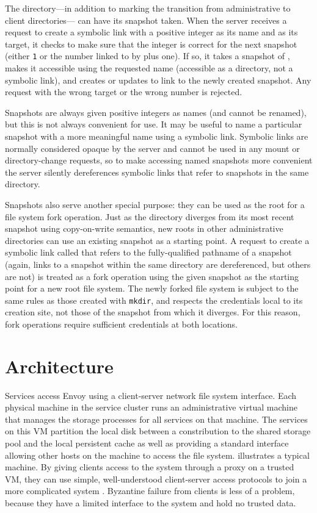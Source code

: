 The \current directory---in addition to marking the transition from administrative to client directories--- can have its snapshot taken. When the server receives a request to create a symbolic link with a positive integer as its name and \current as its target, it checks to make sure that the integer is correct for the next snapshot (either \texttt{1} or the number linked to by \snapshot plus one). If so, it takes a snapshot of \current, makes it accessible using the requested name (accessible as a directory, not a symbolic link), and creates or updates \snapshot to link to the newly created snapshot. Any request with the wrong target or the wrong number is rejected.

Snapshots are always given positive integers as names (and cannot be renamed), but this is not always convenient for use. It may be useful to name a particular snapshot with a more meaningful name using a symbolic link. Symbolic links are normally considered opaque by the server and cannot be used in any mount or directory-change requests, so to make accessing named snapshots more convenient the server silently dereferences symbolic links that refer to snapshots in the same directory.

Snapshots also serve another special purpose: they can be used as the root for a file system fork operation. Just as the \current directory diverges from its most recent snapshot using copy-on-write semantics, new \current roots in other administrative directories can use an existing snapshot as a starting point. A request to create a symbolic link called \current that refers to the fully-qualified pathname of a snapshot (again, links to a snapshot within the same directory are dereferenced, but others are not) is treated as a fork operation using the given snapshot as the starting point for a new root file system. The newly forked file system is subject to the same rules as those created with \texttt{mkdir}, and respects the credentials local to its creation site, not those of the snapshot from which it diverges. For this reason, fork operations require sufficient credentials at both locations.

\section{Architecture}

Services access Envoy using a client-server network file system interface. Each physical machine in the service cluster runs an administrative virtual machine that manages the storage processes for all services on that machine. The services on this VM partition the local disk between a constribution to the shared storage pool and the local persistent cache as well as providing a standard interface allowing other hosts on the machine to access the file system.  illustrates a typical machine. By giving clients access to the system through a proxy on a trusted VM, they can use simple, well-understood client-server access protocols to join a more complicated system \cite{shapiro}. Byzantine failure from clients is less of a problem, because they have a limited interface to the system and hold no trusted data.

